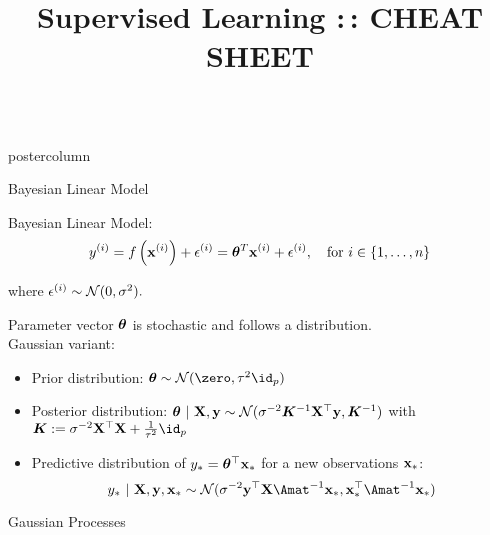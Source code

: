 \documentclass{beamer}
\title{Supervised Learning :\,: CHEAT SHEET} %
\newlength{\columnheight} %
\begin{document}
\begin{frame}[fragile]{}
\begin{columns}
	\begin{column}{.31\textwidth}
		\begin{beamercolorbox}[center]{postercolumn}
			\begin{minipage}{.98\textwidth}
				\parbox[t][\columnheight]{\textwidth}{

					\begin{myblock}{Bayesian Linear Model}
							
								Bayesian Linear Model:
							$$y^{(i)} = f\left(\mathbf{x}^{(i)}\right) + \epsilon^{(i)} = \bm{\theta}^T \mathbf{x}^{(i)} + \epsilon^{(i)}, \quad \text{for } i \in \{1, \ldots, n\}$$
								
								where $\epsilon^{(i)} \sim \mathcal{N}(0, \sigma^2).$
							
								Parameter vector $\bm{\theta}$ is stochastic and follows a distribution.\\
							
								
								Gaussian variant:
								\begin{itemize}[$\bullet$]
									\setlength{\itemindent}{+.3in}
									\item Prior distribution: $\thetav \sim \mathcal{N}(\zero, \tau^2 \id_p)$ 
									\item Posterior distribution:	$
									\bm{\theta} ~|~ \mathbf{X}, \mathbf{y} \sim \mathcal{N}(\sigma^{-2}\bm{K}^{-1}\mathbf{X}^\top\mathbf{y}, \bm{K}^{-1})
									$ with $\bm{K}:= \sigma^{-2}\Xmat^\top\Xmat + \frac{1}{\tau^2} \id_p$
									\item Predictive distribution of $y_* = 	\bm{\theta}^\top \mathbf{x}_*$ for a new observations $\mathbf{x}_*$: 
									$$
									y_* ~|~ \Xmat, \yv, \xv_* \sim \mathcal{N}(\sigma^{-2}\yv^\top \Xmat \Amat^{-1}\xv_*, \xv_*^\top\Amat^{-1}\xv_*)
									$$
								\end{itemize}
\end{myblock}

                \begin{myblock}{Gaussian Processes}
                  
                  
								\\
							


\end{myblock}}
\end{minipage}
\end{beamercolorbox}
\end{column}
\end{columns}
\end{frame}
\end{document}

